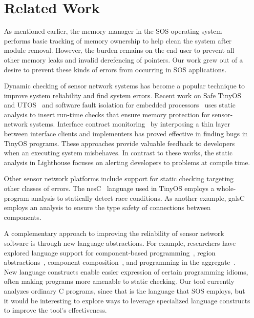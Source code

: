 \section{Related Work}
\label{sec:related}


As mentioned earlier, the memory manager in the SOS operating
system~\cite{sos} performs basic tracking of memory ownership to help
clean the system after module removal.
%
However, the burden remains on the end user to prevent all other memory
leaks and invalid derefencing of pointers.
%
Our work grew out of a desire to prevent these kinds of errors from
occurring in SOS applications.



Dynamic checking of sensor network systems has become a popular technique to
improve system reliability and find system errors.
%
Recent work on Safe TinyOS and UTOS~\cite{regehr06memory} and software fault
isolation for embedded processors~\cite{kumar07memory} uses static analysis
to insert run-time checks that ensure memory protection for sensor-network
systems.
%
Interface contract monitoring~\cite{archer07interface} by interposing a thin
layer between interface clients and implementers has proved effective in
finding bugs in TinyOS programs.
%
These approaches provide valuable feedback to developers when an executing
system misbehaves.
%
In contrast to these works, the static analysis in Lighthouse focuses on
alerting developers to problems at compile time.



Other sensor network platforms include support for static checking targeting
other classes of errors.  
%
The nesC~\cite{nesC} language used in TinyOS employs a whole-program
analysis to statically detect race conditions.  
%
As another example, galsC~\cite{TinyGALS,galsC} employs an analysis to
ensure the type safety of connections between components.  



A complementary approach to improving the reliability of sensor network
software is through new language abstractions.  
%
For example, researchers have explored language support for component-based
programming~\cite{TinyOS,nesC,galsC}, region
abstractions~\cite{conf/mobisys/WhitehouseSCB04,conf/nsdi/WelshM04},
component composition~\cite{conf/sensys/GreensteinKE04}, and programming in
the aggregate~\cite{1052213,conf/dcoss/GummadiGG05}.
%
New language constructs enable easier expression of certain programming
idioms, often making programs more amenable to static checking.  
%
Our tool currently analyzes ordinary C programs, since that is the language
that SOS employs, but it would be interesting to explore ways to leverage
specialized language constructs to improve the tool's effectiveness.



